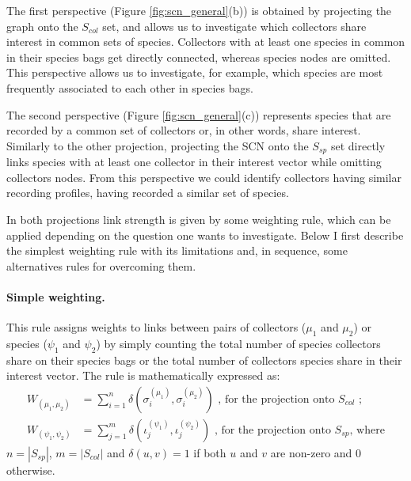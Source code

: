 The first perspective (Figure \ref{fig:scn_general}(b)) is obtained by projecting the graph onto the $S_{col}$ set, and allows us to investigate which collectors share interest in common sets of species. Collectors with at least one species in common in their species bags get directly connected, whereas species nodes are omitted. This perspective allows us to investigate, for example, which species are most frequently associated to each other in species bags.%

The second perspective (Figure \ref{fig:scn_general}(c)) represents species that are recorded by a common set of collectors or, in other words, share interest. Similarly to the other projection, projecting the SCN onto the $S_{sp}$ set directly links species with at least one collector in their interest vector while omitting collectors nodes. From this perspective we could identify collectors having similar recording profiles, having recorded a similar set of species. 

In both projections link strength is given by some weighting rule, which can be applied depending on the question one wants to investigate. Below I first describe the simplest weighting rule with its limitations and, in sequence, some alternatives rules for overcoming them.

\paragraph*{Simple weighting.}
This rule assigns weights to links between pairs of collectors ($\mu_1$ and $\mu_2$) or species ($\psi_1$ and $\psi_2$) by simply counting the total number of species collectors share on their species bags or the total number of collectors species share in their interest vector. The rule is mathematically expressed as:
\begin{equation} \label{eq:simple_weighting}
\begin{split}
W_{(\mu_1, \mu_2)} &= \sum_{i=1}^{n} \delta(\sigma_i^{(\mu_1)}, \sigma_i^{(\mu_2)})\mbox{ , for the projection onto }S_{col}\mbox{ ;}\\
W_{(\psi_1, \psi_2)} &= \sum_{j=1}^{m} \delta(\iota_j^{(\psi_1)}, \iota_j^{(\psi_2)})
\mbox{ , for the projection onto }S_{sp}\mbox{, where}
\end{split}
\end{equation}
$n = |S_{sp}|$, $m = |S_{col}|$ and $\delta(u,v)=1$ if both $u$ and $v$ are non-zero and $0$ otherwise.

